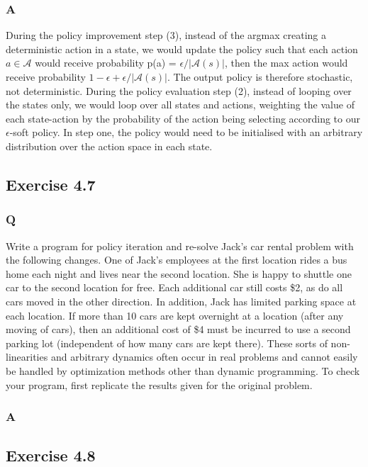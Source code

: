 \subsubsection{A}
During the policy improvement step (3), instead of the argmax creating a deterministic action in a state, we would update the policy such that each action $a \in \mathcal{A}$ would receive probability p(a) = $\epsilon /|\mathcal{A}(s)|$, then the max action would receive probability $1 - \epsilon + \epsilon /|\mathcal{A}(s)|$. The output policy is therefore stochastic, not deterministic. During the policy evaluation step (2), instead of looping over the states only, we would loop over all states and actions, weighting the value of each state-action by the probability of the action being selecting according to our $\epsilon$-soft policy. In step one, the policy would need to be initialised with an arbitrary distribution over the action space in each state.

\subsection*{Exercise 4.7}
\subsubsection{Q}
Write a program for policy iteration and re-solve Jack’s car rental problem with the following changes. One of Jack’s employees at the first location rides a bus home each night and lives near the second location. She is happy to shuttle one car to the second location for free. Each additional car still costs \$2, as do all cars moved in the other direction. In addition, Jack has limited parking space at each location. If more than 10 cars are kept overnight at a location (after any moving of cars), then an additional cost of \$4 must be incurred to use a second parking lot (independent of how many cars are kept there). These sorts of non-linearities and arbitrary dynamics often occur in real problems and cannot easily be handled by optimization methods other than dynamic programming. To check your program, first replicate the results given for the original problem.
\subsubsection{A}
\ProgrammingExercise

\subsection*{Exercise 4.8}
